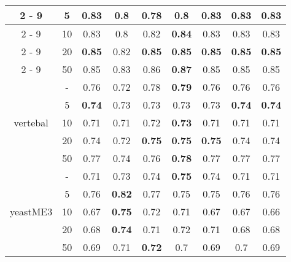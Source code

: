 \documentclass{article}%
\begin{document}
\begin{tabular}{c|c|ccccccc}
\cline{2%
-%
9}%
&5&\textbf{0.83}&0.8&0.78&0.8&\textbf{0.83}&\textbf{0.83}&\textbf{0.83}\\%
\cline{2%
-%
9}%
&10&0.83&0.8&0.82&\textbf{0.84}&0.83&0.83&0.83\\%
\cline{2%
-%
9}%
&20&\textbf{0.85}&0.82&\textbf{0.85}&\textbf{0.85}&\textbf{0.85}&\textbf{0.85}&\textbf{0.85}\\%
\cline{2%
-%
9}%
&50&0.85&0.83&0.86&\textbf{0.87}&0.85&0.85&0.85\\%
\hline%
\multirow{5}{*}{vertebal}&{-}&0.76&0.72&0.78&\textbf{0.79}&0.76&0.76&0.76\\%
\cline{2%
-%
9}%
&5&\textbf{0.74}&0.73&0.73&0.73&0.73&\textbf{0.74}&\textbf{0.74}\\%
\cline{2%
-%
9}%
&10&0.71&0.71&0.72&\textbf{0.73}&0.71&0.71&0.71\\%
\cline{2%
-%
9}%
&20&0.74&0.72&\textbf{0.75}&\textbf{0.75}&\textbf{0.75}&0.74&0.74\\%
\cline{2%
-%
9}%
&50&0.77&0.74&0.76&\textbf{0.78}&0.77&0.77&0.77\\%
\hline%
\multirow{5}{*}{yeastME3}&{-}&0.71&0.73&0.74&\textbf{0.75}&0.74&0.71&0.71\\%
\cline{2%
-%
9}%
&5&0.76&\textbf{0.82}&0.77&0.75&0.75&0.76&0.76\\%
\cline{2%
-%
9}%
&10&0.67&\textbf{0.75}&0.72&0.71&0.67&0.67&0.66\\%
\cline{2%
-%
9}%
&20&0.68&\textbf{0.74}&0.71&0.72&0.71&0.68&0.68\\%
\cline{2%
-%
9}%
&50&0.69&0.71&\textbf{0.72}&0.7&0.69&0.7&0.69\\%
\hline%
\end{tabular}

%
\end{document}
